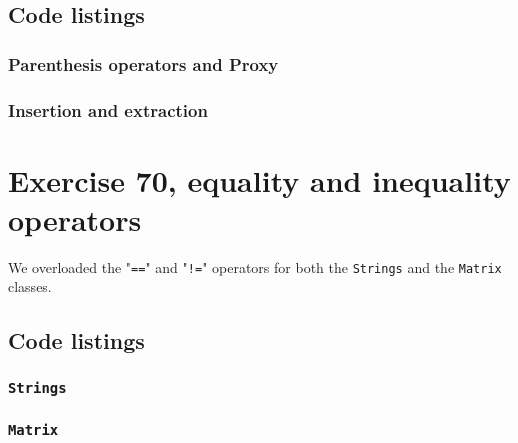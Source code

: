 \documentclass[11pt]{article}
\begin{document}
\subsection*{Code listings}


\subsubsection*{Parenthesis operators and Proxy}






\subsubsection*{Insertion and extraction}




\section*{Exercise 70, equality and inequality operators}
We overloaded the "\texttt{==}" and "\texttt{!=}" operators for both the \texttt{Strings} and the \texttt{Matrix} classes.

\subsection*{Code listings}
\subsubsection*{\texttt{Strings}}




\subsubsection*{\texttt{Matrix}}


\end{document}
